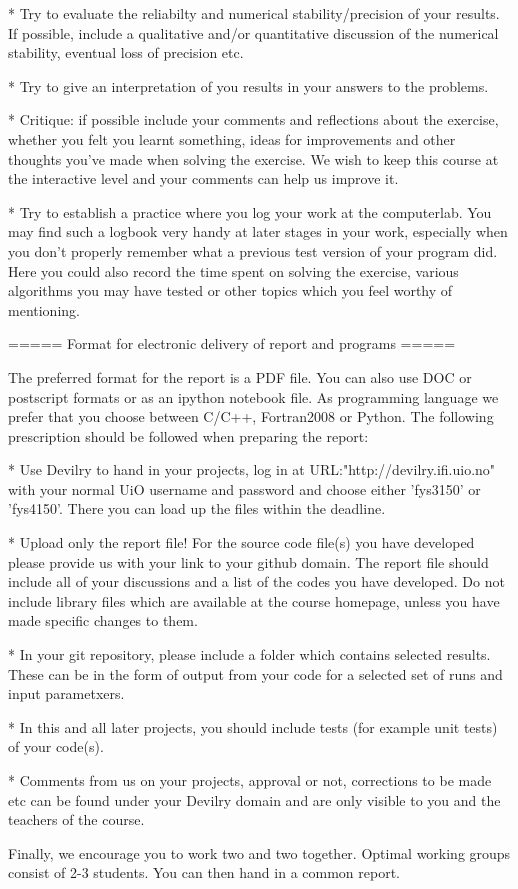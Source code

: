 \documentclass[11pt,a4paper]{article}
\begin{document}
  * Try to evaluate the reliabilty and numerical stability/precision of your results. If possible, include a qualitative and/or quantitative discussion of the numerical stability, eventual loss of precision etc.

  * Try to give an interpretation of you results in your answers to  the problems.

  * Critique: if possible include your comments and reflections about the  exercise, whether you felt you learnt something, ideas for improvements and  other thoughts you've made when solving the exercise. We wish to keep this course at the interactive level and your comments can help us improve it.

  * Try to establish a practice where you log your work at the  computerlab. You may find such a logbook very handy at later stages in your work, especially when you don't properly remember  what a previous test version  of your program did. Here you could also record  the time spent on solving the exercise, various algorithms you may have tested or other topics which you feel worthy of mentioning.





===== Format for electronic delivery of report and programs =====

The preferred format for the report is a PDF file. You can also use DOC or postscript formats or as an ipython notebook file.  As programming language we prefer that you choose between C/C++, Fortran2008 or Python. The following prescription should be followed when preparing the report:

  * Use Devilry to hand in your projects, log in  at  URL:"http://devilry.ifi.uio.no" with your normal UiO username and password and choose either 'fys3150' or 'fys4150'. There you can load up the files within the deadline.

  * Upload only the report file!  For the source code file(s) you have developed please provide us with your link to your github domain.  The report file should include all of your discussions and a list of the codes you have developed.  Do not include library files which are available at the course homepage, unless you have made specific changes to them.

  * In your git repository, please include a folder which contains selected results. These can be in the form of output from your code for a selected set of runs and input parametxers.

  * In this and all later projects, you should include tests (for example unit tests) of your code(s).

  * Comments  from us on your projects, approval or not, corrections to be made  etc can be found under your Devilry domain and are only visible to you and the teachers of the course.



Finally, 
we encourage you to work two and two together. Optimal working groups consist of 
2-3 students. You can then hand in a common report. 
\end{document}
